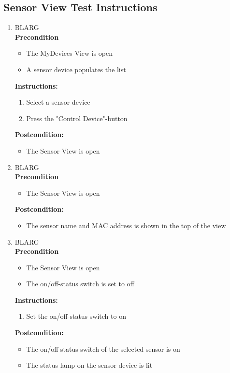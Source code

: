 \documentclass[a4paper]{article}
\newlength{\testlabellength}
\newenvironment{testlist}{\begin{enumerate}[label=\bfseries Instruction \thesubsection.\arabic* , labelindent=0pt, labelwidth=\testlabellength , leftmargin=2cm]}{\end{enumerate}}
\newenvironment{precondition}{
{\color{white}BLARG}\\ 
\textbf{Precondition}
\begin{itemize}[labelindent=0cm, labelwidth=2cm , leftmargin=1cm]
}
{\end{itemize}}
\newenvironment{instruction}{
\textbf{Instructions:}
\begin{enumerate}[label=\bfseries  \arabic*., labelindent=0cm, labelwidth=2cm , leftmargin=1cm]
}
{\end{enumerate}}
\newenvironment{postcondition}{
\textbf{Postcondition:}
\begin{itemize}[labelindent=0cm, labelwidth=2cm , leftmargin=1cm]
}
{\end{itemize}}
\begin{document}
\begin{appendices}
\begin{testlist}
\end{testlist}

\subsection{Sensor View Test Instructions}
\begin{testlist}
	\item
 		\begin{precondition}
 			\item The MyDevices View is open
 			\item A sensor device populates the list
 		\end{precondition}
 		\begin{instruction}
 			\item Select a sensor device
 			\item Press the "Control Device"-button
 		\end{instruction}
 		\begin{postcondition}
 			\item The Sensor View is open
 		\end{postcondition}


	\item
		\begin{precondition}
			\item The Sensor View is open
		\end{precondition}
		\begin{postcondition}
			\item The sensor name and MAC address is shown in the top of the view
		\end{postcondition}

	\item
		\begin{precondition}
			\item The Sensor View is open
			\item The on/off-status switch is set to off
		\end{precondition}
		\begin{instruction}
			\item Set the on/off-status switch to on
	  	\end{instruction}
	  	\begin{postcondition}
	  		\item The on/off-status switch of the selected sensor is on
	  		\item The status lamp on the sensor device is lit
	  	\end{postcondition}


\end{testlist}
\end{appendices}
\end{document}
